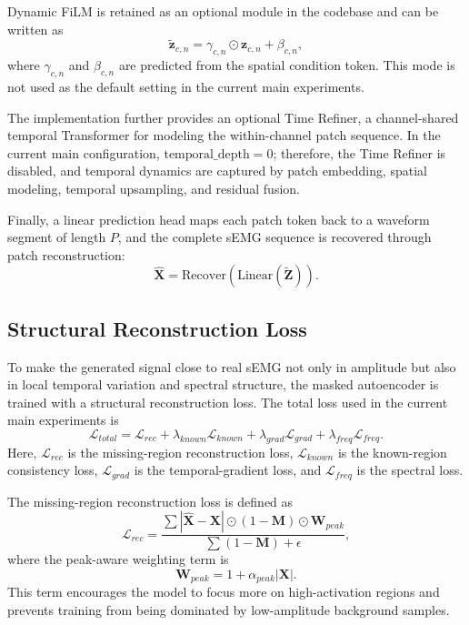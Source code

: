 \documentclass[journal]{IEEEtran}
\begin{document}
Dynamic FiLM is retained as an optional module in the codebase and can be written as
\begin{equation}
\tilde{\mathbf{z}}_{c,n} = \gamma_{c,n} \odot \mathbf{z}_{c,n} + \beta_{c,n},
\end{equation}
where $\gamma_{c,n}$ and $\beta_{c,n}$ are predicted from the spatial condition token. This mode is not used as the default setting in the current main experiments.

The implementation further provides an optional Time Refiner, a channel-shared temporal Transformer for modeling the within-channel patch sequence. In the current main configuration, $\mathrm{temporal\_depth}=0$; therefore, the Time Refiner is disabled, and temporal dynamics are captured by patch embedding, spatial modeling, temporal upsampling, and residual fusion.

Finally, a linear prediction head maps each patch token back to a waveform segment of length $P$, and the complete sEMG sequence is recovered through patch reconstruction:
\begin{equation}
\hat{\mathbf{X}} = \mathrm{Recover}\left(\mathrm{Linear}(\tilde{\mathbf{Z}})\right).
\end{equation}

\subsection{Structural Reconstruction Loss}
To make the generated signal close to real sEMG not only in amplitude but also in local temporal variation and spectral structure, the masked autoencoder is trained with a structural reconstruction loss. The total loss used in the current main experiments is
\begin{equation}
\mathcal{L}_{total} = \mathcal{L}_{rec} + \lambda_{known}\mathcal{L}_{known} + \lambda_{grad}\mathcal{L}_{grad} + \lambda_{freq}\mathcal{L}_{freq}.
\end{equation}
Here, $\mathcal{L}_{rec}$ is the missing-region reconstruction loss, $\mathcal{L}_{known}$ is the known-region consistency loss, $\mathcal{L}_{grad}$ is the temporal-gradient loss, and $\mathcal{L}_{freq}$ is the spectral loss.

The missing-region reconstruction loss is defined as
\begin{equation}
\mathcal{L}_{rec} = \frac{\sum |\hat{\mathbf{X}}-\mathbf{X}| \odot (1-\mathbf{M}) \odot \mathbf{W}_{peak}}{\sum (1-\mathbf{M})+\epsilon},
\end{equation}
where the peak-aware weighting term is
\begin{equation}
\mathbf{W}_{peak} = 1+\alpha_{peak}|\mathbf{X}|.
\end{equation}
This term encourages the model to focus more on high-activation regions and prevents training from being dominated by low-amplitude background samples.
\end{document}
